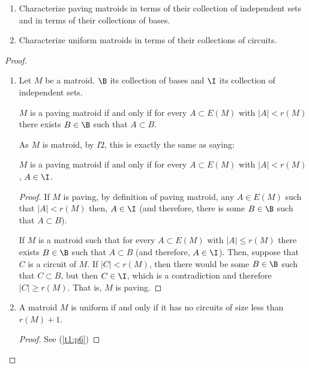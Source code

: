 \prob
{   $\,$\pn
    \begin{enumerate}[label=(\roman*)]
        \item   Characterize paving matroids in terms of their collection of 
                independent sets and in terms of their collections of bases.
        
        \item   Characterize uniform matroids in terms of their collections of 
                circuits.
    \end{enumerate}
}
\begin{proof}
    $\;$\pn
    \begin{enumerate}[label=(\roman*)]
        \item   Let $M$ be a matroid. $\B$ its collection of bases and $\I$ its collection
                of independent sets.\pn
                
                $M$ is a paving matroid if and only if for every $A \subset E(M)$ with
                $|A| < r(M)$ there exists $B \in \B$ such that $A \subset B$.\pn
                
                As $M$ is matroid, by $I2$, this is exactly the same as saying:\pn
                
                $M$ is a paving matroid if and only if for every $A \subset E(M)$ with
                $|A| < r(M)$, $A \in \I$.\pn
                
                \begin{proof}
                    If $M$ is paving, by definition of paving matroid, any $A \in E(M)$ such
                    that $|A| < r(M)$ then, $A \in \I$ (and therefore, there is some $B \in \B$
                    such that $A \subset B$).\pn
                    
                    If $M$ is a matroid such that for every $A \subset E(M)$ with
                    $|A| \leq r(M)$ there exists $B \in \B$ such that $A \subset B$ (and 
                    therefore, $A \in \I$). Then, suppose that $C$ is a circuit of $M$. 
                    If $|C| < r(M)$, then there would be some $B \in \B$ such that 
                    $C \subset B$, but then $C \in \I$, which is a contradiction and therefore 
                    $|C| \geq r(M)$. That is, $M$ is paving.\pn
                \end{proof}
                
        \item   A matroid $M$ is uniform if and only if it has no circuits of size less than 
               $r(M) + 1$.
            
                \begin{proof}
                    See (\ref{t1:p6})
                \end{proof}
    \end{enumerate}
\end{proof}